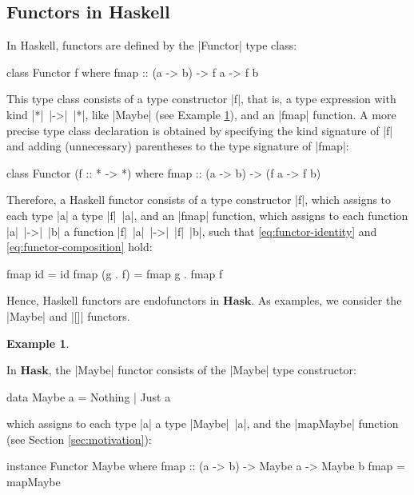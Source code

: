 \documentclass[11pt,letterpaper]{article}
\theoremstyle{definition}
\newtheorem{example}{Example}[section]
\newcommand{\catbf}[1]{\ensuremath{\mathbf{#1}}\xspace}
\newcommand{\hask}{\catbf{Hask}}
\begin{document}
\subsection{Functors in Haskell}
\label{sec:functors-haskell}

In Haskell, functors are defined by the |Functor| type class:
\begin{code}
class Functor f where
  fmap :: (a -> b) -> f a -> f b
\end{code}
This type class consists of a type constructor |f|, that is, a type
expression with kind |*|~|->|~|*|, like |Maybe| (see Example
\ref{ex:functor-maybe}), and an |fmap| function. A more precise type
class declaration is obtained by specifying the kind signature of |f|
and adding (unnecessary) parentheses to the type signature of |fmap|:
\begin{code}
class Functor (f :: * -> *) where
  fmap :: (a -> b) -> (f a -> f b)
\end{code}

Therefore, a Haskell functor consists of a type constructor |f|, which
assigns to each type |a| a type |f|~|a|, and an |fmap| function, which
assigns to each function |a|~|->|~|b| a function |f|~|a|~|->|~|f|~|b|,
such that \eqref{eq:functor-identity} and
\eqref{eq:functor-composition} hold:
\begin{code}
fmap id      = id
fmap (g . f) = fmap g . fmap f
\end{code}

Hence, Haskell functors are endofunctors in \hask. As examples, we
consider the |Maybe| and |[]| functors.

\begin{example}
  \label{ex:functor-maybe}


  In \hask, the |Maybe| functor consists of the |Maybe| type
  constructor:
  \begin{code}
data Maybe a = Nothing | Just a
  \end{code}
  which assigns to each type |a| a type |Maybe|~|a|, and the
  |mapMaybe| function (see Section \ref{sec:motivation}):
  \begin{code}
instance Functor Maybe where
  fmap :: (a -> b) -> Maybe a -> Maybe b
  fmap = mapMaybe
  \end{code}

\end{example}
\end{document}
